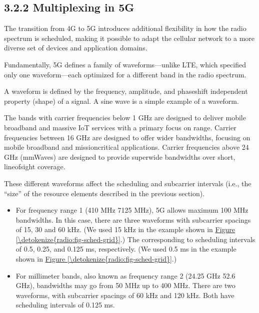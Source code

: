 \documentclass[a4paper,11pt,english]{sphinxmanual}
\begin{document}
\subsection{3.2.2 Multiplexing in 5G}
\label{\detokenize{radio:multiplexing-in-5g}}
\sphinxAtStartPar
The transition from 4G to 5G introduces additional flexibility in
how the radio spectrum is scheduled, making it possible to adapt the
cellular network to a more diverse set of devices and application
domains.

\sphinxAtStartPar
Fundamentally, 5G defines a family of waveforms—unlike LTE, which
specified only one waveform—each optimized for a different band in the
radio spectrum.%
\begin{footnote}[2]\sphinxAtStartFootnote
A waveform is defined by the frequency, amplitude, and phase\sphinxhyphen{}shift
independent property (shape) of a signal. A sine wave is a simple
example of a waveform.
%
\end{footnote}  The bands with carrier frequencies below 1 GHz are
designed to deliver mobile broadband and massive IoT services with a
primary focus on range. Carrier frequencies between 1\sphinxhyphen{}6 GHz are
designed to offer wider bandwidths, focusing on mobile broadband and
mission\sphinxhyphen{}critical applications. Carrier frequencies above 24 GHz
(mmWaves) are designed to provide super\sphinxhyphen{}wide bandwidths over short,
line\sphinxhyphen{}of\sphinxhyphen{}sight coverage.

\sphinxAtStartPar
These different waveforms affect the scheduling and subcarrier intervals
(i.e., the “size” of the resource elements described in the previous
section).
\begin{itemize}
\item {} 
\sphinxAtStartPar
For frequency range 1 (410 MHz \sphinxhyphen{} 7125 MHz), 5G allows maximum 100 MHz
bandwidths. In this case, there are three waveforms with subcarrier
spacings of 15, 30 and 60 kHz. (We used 15 kHz in the example shown in
\hyperref[\detokenize{radio:fig-sched-grid}]{Figure \ref{\detokenize{radio:fig-sched-grid}}}.) The corresponding to scheduling
intervals of 0.5, 0.25, and 0.125 ms, respectively. (We used 0.5 ms in
the example shown in \hyperref[\detokenize{radio:fig-sched-grid}]{Figure \ref{\detokenize{radio:fig-sched-grid}}}.)

\item {} 
\sphinxAtStartPar
For millimeter bands, also known as frequency range 2 (24.25 GHz \sphinxhyphen{}
52.6 GHz), bandwidths may go from 50 MHz up to 400 MHz. There are
two waveforms, with subcarrier spacings of 60 kHz and 120 kHz. Both
have scheduling intervals of 0.125 ms.

\end{itemize}
\end{document}
